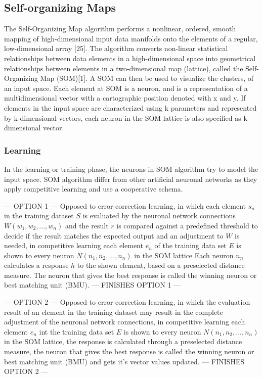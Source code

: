 \documentclass{article}
\begin{document}
\subsection{Self-organizing Maps} %
The Self-Organizing Map algorithm performs a nonlinear, ordered, smooth mapping of high-dimensional input data manifolds onto the elements of a regular, low-dimensional array [25]. The algorithm converts non-linear statistical relationships between data elements in a high-dimensional space into geometrical relationships between elements in a two-dimensional map (lattice), called the Self-Organizing Map (SOM)[1]. A SOM can then be used to visualize the clusters, of an input space. Each element at SOM is a neuron, and is a representation of a multidimensional vector with a cartographic position denoted with x and y. If elements in the input space are characterized using k parameters and represented by k-dimensional vectors, each neuron in the SOM lattice is also specified as k-dimensional vector.

\subsubsection{Learning} %
In the learning or training phase, the neurons in SOM algorithm try to model the input space. 
SOM algorithm differ from other artificial neuronal networks as they apply competitive learning and use a cooperative schema. 

--- OPTION 1 ---
Opposed to error-correction learning, in which each element $s_n$ in the training dataset $S$ is evaluated by the neuronal network connections $W(w_1, w_2,...,w_n)$ and the result $r$ is compared against a predefined threshold to decide if the result matches the expected output and an adjustment to $W$ is needed, in competitive learning each element $e_n$ of the training data set $E$ is shown to every neuron $N(n_1,n_2,...,n_n)$ in the SOM lattice Each neuron $n_n$ calculates a response $h$ to the shown element, based on a preselected distance measure. The neuron that gives the best response is called the winning neuron or best matching unit (BMU).
--- FINISHES OPTION 1 ---

--- OPTION 2 ---
Opposed to error-correction learning, in which the evaluation result of an element in the training dataset may result in the complete adjustment of the neuronal network connections, in competitive learning each element $e_n$ int the training data set $E$ is shown to every neuron $N(n_1,n_2,...,n_n)$ in the SOM lattice, the response is calculated through a preselected distance measure, the neuron that gives the best response is called the winning neuron or best matching unit (BMU) and gets it's vector values updated.
--- FINISHES OPTION 2 ---
\end{document}
